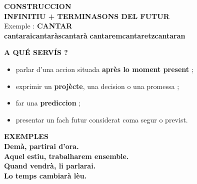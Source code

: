 \documentclass[a4paper,11pt]{article}
\begin{document}
\vspace{2.5mm}\hspace*{6mm}
\begin{minipage}{0.91\textwidth}

\begin{orangebox}
\textbf{\color{OrangeDark}CONSTRUCCION}\\[1mm]
\centering
{\Large \textbf{INFINITIU + TERMINASONS DEL FUTUR}}\\[1mm]
\small
Exemple : \textbf{CANTAR}\\[1mm]
\textbf{cantarai}\quad \textbf{cantaràs}\quad \textbf{cantarà}\quad
\textbf{cantarem}\quad \textbf{cantaretz}\quad \textbf{cantaran}
\end{orangebox}

\vspace{2.5mm}
\begin{center}
\end{center}

\vspace{1.5mm}
\begin{orangebox}
\textbf{\color{OrangeDark}A QUÉ SERVÍS ?}\\[1mm]
\begin{itemize}\setlength{\itemsep}{0.4mm}
\item parlar d'una accion situada \textbf{après lo moment present} ;
\item exprimir un \textbf{projècte}, una decision o una promessa ;
\item far una \textbf{prediccion} ;
\item presentar un fach futur considerat coma segur o previst.
\end{itemize}
\end{orangebox}

\vspace{2mm}
\begin{orangebox}
\textbf{\color{OrangeDark}EXEMPLES}\\[1mm]
\textbf{Demà, partirai d'ora.}\\
\textbf{Aquel estiu, trabalharem ensemble.}\\
\textbf{Quand vendrà, li parlarai.}\\
\textbf{Lo temps cambiarà lèu.}
\end{orangebox}


\end{minipage}
\end{document}
